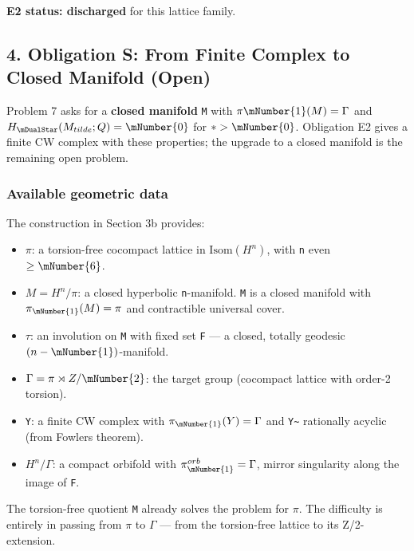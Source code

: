 \textbf{E2 status: discharged} for this lattice family.

\hypertarget{4-obligation-s-from-finite-complex-to-closed-manifold-open}{%
\subsection{4. Obligation S: From Finite Complex to Closed Manifold (Open)}\label{4-obligation-s-from-finite-complex-to-closed-manifold-open}}

Problem 7 asks for a \textbf{closed manifold} \texttt{M} with \(\pi\mNumber{1}(M) = \Gamma\) and
\(H_{\mDualStar}(M_{tilde}; Q) = \mNumber{0}\) for \(* > \mNumber{0}\). Obligation E2 gives a finite CW
complex with these properties; the upgrade to a closed manifold is the
remaining open problem.

\hypertarget{available-geometric-data}{%
\subsubsection{Available geometric data}\label{available-geometric-data}}

The construction in Section 3b provides:

\begin{itemize}
\tightlist
\item
  \(\pi\): a torsion-free cocompact lattice in \(\mathup{Isom}(H^{n})\), with \texttt{n} even
  \(\ge \mNumber{6}\).
\item
  \(M = H^{n}/\pi\): a closed hyperbolic \texttt{n}-manifold. \texttt{M} is a closed manifold
  with \(\pi_\mNumber{1}(M) = \pi\) and contractible universal cover.
\item
  \(\tau\): an involution on \texttt{M} with fixed set \texttt{F} --- a closed, totally
  geodesic \((n-\mNumber{1})\)-manifold.
\item
  \(\Gamma = \pi \rtimes Z/\mNumber{2}\): the target group (cocompact lattice with
  order-2 torsion).
\item
  \texttt{Y}: a finite CW complex with \(\pi_\mNumber{1}(Y) = \Gamma\) and \texttt{Y\textasciitilde{}} rationally
  acyclic (from Fowler\textquotesingle s theorem).
\item
  \(H^{n}/\Gamma\): a compact orbifold with \(\pi_\mNumber{1}^{orb} = \Gamma\), mirror
  singularity along the image of \texttt{F}.
\end{itemize}

The torsion-free quotient \texttt{M} already solves the problem for \(\pi\). The
difficulty is entirely in passing from \(\pi\) to \(\Gamma\) --- from the
torsion-free lattice to its Z/2-extension.

